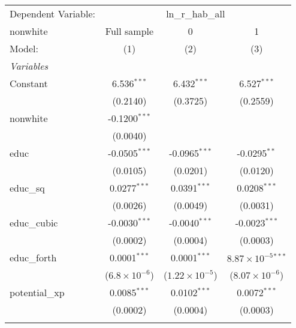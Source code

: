 \begingroup
\centering
\begin{tabular}{lccc}
   \tabularnewline \midrule \midrule
   Dependent Variable: & \multicolumn{3}{c}{ln\_r\_hab\_all}\\
   nonwhite                        & Full sample            & 0                       & 1 \\   
   Model:                          & (1)                    & (2)                     & (3)\\  
   \midrule
   \emph{Variables}\\
   Constant                        & 6.536$^{***}$          & 6.432$^{***}$           & 6.527$^{***}$\\   
                                   & (0.2140)               & (0.3725)                & (0.2559)\\   
   nonwhite                        & -0.1200$^{***}$        &                         &   \\   
                                   & (0.0040)               &                         &   \\   
   educ                            & -0.0505$^{***}$        & -0.0965$^{***}$         & -0.0295$^{**}$\\   
                                   & (0.0105)               & (0.0201)                & (0.0120)\\   
   educ\_sq                        & 0.0277$^{***}$         & 0.0391$^{***}$          & 0.0208$^{***}$\\   
                                   & (0.0026)               & (0.0049)                & (0.0031)\\   
   educ\_cubic                     & -0.0030$^{***}$        & -0.0040$^{***}$         & -0.0023$^{***}$\\   
                                   & (0.0002)               & (0.0004)                & (0.0003)\\   
   educ\_forth                     & 0.0001$^{***}$         & 0.0001$^{***}$          & $8.87\times 10^{-5}$$^{***}$\\    
                                   & ($6.8\times 10^{-6}$)  & ($1.22\times 10^{-5}$)  & ($8.07\times 10^{-6}$)\\    
   potential\_xp                   & 0.0085$^{***}$         & 0.0102$^{***}$          & 0.0072$^{***}$\\   
                                   & (0.0002)               & (0.0004)                & (0.0003)\\   
$$
\end{tabular}
